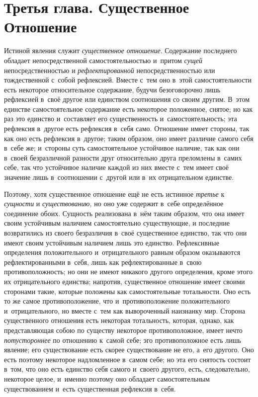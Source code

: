 \chapter[{\em Третья глава} Существенное Отношение]
{Третья глава. Существенное Отношение}

Истиной явления служит {\em существенное отношение}. Содержание последнего
обладает непосредственной самостоятельностью и~притом {\em сущей}
непосредственностью и {\em рефлектированной} непосредственностью или
тождественной с~собой рефлексией. Вместе с~тем оно в~этой самостоятельности
есть некоторое относительное содержание, будучи безоговорочно лишь
рефлексией в~своё другое или единством соотношения со своим другим. В~этом
единстве самостоятельное содержание есть некоторое положенное, снятое; но
как раз это единство и~составляет его существенность и~самостоятельность;
эта рефлексия в~другое есть рефлексия в~себя само. Отношение имеет стороны,
так как оно есть рефлексия в~другое; таким образом, оно имеет различие
самого себя в~себе же; и~стороны суть самостоятельное устойчивое наличие,
так как они в~своей безразличной разности друг относительно друга преломлены
в~самих себе, так что устойчивое наличие каждой из них вместе с~тем имеет
своё значение лишь в~соотношении с~другой или в~их отрицательном единстве.

Поэтому, хотя существенное отношение ещё не есть истинное {\em третье}
к {\em сущности} и {\em существованию,} но оно уже содержит в~себе
определённое соединение обоих. Сущность реализована в~нём таким образом,
что она имеет своим устойчивым наличием самостоятельно существующие, и
последние возвратились из своего безразличия в~своё существенное единство,
так что они имеют своим устойчивым наличием лишь это единство. Рефлексивные
определения положительного и~отрицательного равным образом оказываются
рефлектированными в~себя, лишь как рефлектированные в~свою
противоположность; но они не имеют никакого другого определения, кроме
этого их отрицательного единства; напротив, существенное отношение имеет
своими сторонами такие, которые положены как самостоятельные тотальности.
Оно есть то же самое противоположение, что и~противоположение
положительного и~отрицательного, но вместе с~тем как вывороченный наизнанку
мир. Сторона существенного отношения есть некоторая тотальность, которая,
однако, как представляющая собою по существу некоторое противоположное,
имеет нечто {\em потустороннее} по отношению к~самой
себе; эго противоположное есть лишь явление; его существование есть скорее
существование не его, а~его другого. Оно есть поэтому некоторое
надломленное в~самом себе; но эта его снятость состоит в~том, что оно есть
единство себя самого и~своего другого, есть, следовательно, некоторое
целое, и~именно поэтому оно обладает самостоятельным существованием и~есть
существенная рефлексия в~себя.

